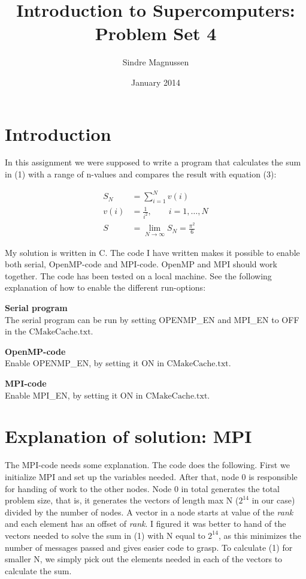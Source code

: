\documentclass{article}
\title{Introduction to Supercomputers: Problem Set 4}
\author{Sindre Magnussen}
\date{January 2014}
\begin{document}
\maketitle

\section*{Introduction}
	In this assignment we were supposed to write a program that calculates the sum in (1) with a range of n-values and compares the result with equation (3):
	
	\begin{align}
	S_N &= \sum_{i = 1}^{N} v(i) \\
	v(i) &= \frac{1}{i^2},\qquad i = 1,\ldots,N \\
	S &= \lim_{N\to\infty} S_N = \frac{\pi^2}{6}
	\end{align}
	
	My solution is written in C. The code I have written makes it possible to enable both serial, OpenMP-code and MPI-code. OpenMP and MPI should work together. The code has been tested on a local machine. See the following explanation of how to enable the different run-options: 

\begin{list}{}{}
\item \textbf{Serial program} \\
	The serial program can be run by setting OPENMP\_EN and MPI\_EN to OFF in the $\mathrm{CMakeCache.txt}$.
	
\item \textbf{OpenMP-code} \\
	Enable OPENMP\_EN, by setting it ON in $\mathrm{CMakeCache.txt}$. 
	
\item \textbf{MPI-code} \\
	Enable MPI\_EN, by setting it ON in $\mathrm{CMakeCache.txt}$. 
\end{list}

\newpage

\section*{Explanation of solution: MPI}
The MPI-code needs some explanation. The code does the following. First we initialize MPI and set up the variables needed. After that, node 0 is responsible for handing of work to the other nodes. Node 0 in total generates the total problem size, that is, it generates the vectors of length max N ($2^{14}$ in our case) divided by the number of nodes. A vector in a node starts at value of the \emph{rank} and each element has an offset of \emph{rank}. I figured it was better to hand of the vectors needed to solve the sum in (1) with N equal to $2^{14}$, as this minimizes the number of messages passed and gives easier code to grasp. To calculate (1) for smaller N, we simply pick out the elements needed in each of the vectors to calculate the sum.
\end{document}
